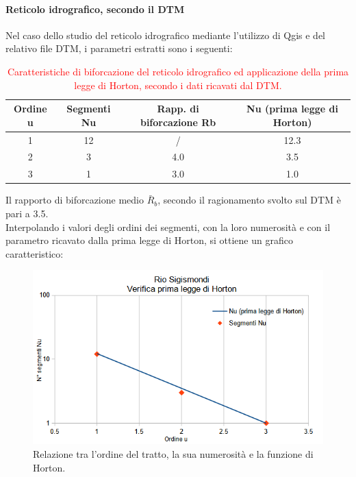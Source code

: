 \paragraph{Reticolo idrografico, secondo il DTM} Nel caso dello studio del reticolo idrografico mediante l'utilizzo di Qgis e del relativo file DTM, i parametri estratti sono i seguenti:
\begin{table}[H] \centering
    \caption{\textcolor{red}{Caratteristiche di biforcazione del reticolo idrografico ed applicazione della prima legge di Horton, secondo i dati ricavati dal DTM.}}
    \label{tab:rapp_biforcazione_2_horton}
    \begin{tabular}{ cccc }
\toprule
    Ordine u & Segmenti Nu & Rapp. di biforcazione Rb & Nu (prima legge di Horton) \\
\midrule    
    1        & 12          &   /        & 12.3                        \\
    2        & 3           & 4.0       & 3.5                        \\
    3        & 1           & 3.0      & 1.0                       \\
\bottomrule    
\end{tabular}
\end{table}

Il rapporto di biforcazione medio $\bar{R}_b$, secondo il ragionamento svolto sul DTM è pari a \num{3.5}.\\
Interpolando i valori degli ordini dei segmenti, con la loro numerosità e con il parametro ricavato dalla prima legge di Horton, si ottiene un grafico caratteristico:
\begin{figure}[H]\centering
    \includegraphics[scale=.75]{immagini/legge_horton_qgis.png}
    \caption{Relazione tra l'ordine del tratto, la sua numerosità e la funzione di Horton.}
    \label{legge_horton_qgis}
\end{figure}


